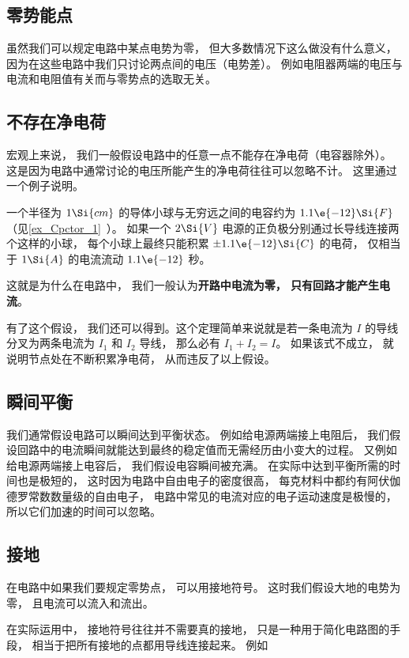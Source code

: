 
\begin{issues}
\issueDraft
\end{issues}


\subsection{零势能点}
虽然我们可以规定电路中某点电势为零， 但大多数情况下这么做没有什么意义， 因为在这些电路中我们只讨论两点间的电压（电势差）。 例如电阻器两端的电压与电流和电阻值有关而与零势点的选取无关。

\subsection{不存在净电荷}
宏观上来说， 我们一般假设电路中的任意一点不能存在净电荷（电容器除外）。 这是因为电路中通常讨论的电压所能产生的净电荷往往可以忽略不计。 这里通过一个例子说明。

\begin{example}{}
一个半径为 $1\Si{cm}$ 的导体小球与无穷远之间的电容约为 $1.1\e{-12} \Si{F}$（见\autoref{ex_Cpctor_1}~）。 如果一个 $2\Si{V}$ 电源的正负极分别通过长导线连接两个这样的小球， 每个小球上最终只能积累 $\pm 1.1\e{-12} \Si{C}$ 的电荷， 仅相当于 $1\Si{A}$ 的电流流动 $1.1\e{-12}$ 秒。
\end{example}
这就是为什么在电路中， 我们一般认为\textbf{开路中电流为零， 只有回路才能产生电流}。

有了这个假设， 我们还可以得到。这个定理简单来说就是若一条电流为 $I$ 的导线分叉为两条电流为 $I_1$ 和 $I_2$ 导线， 那么必有 $I_1 + I_2 = I$。 如果该式不成立， 就说明节点处在不断积累净电荷， 从而违反了以上假设。

\subsection{瞬间平衡}
我们通常假设电路可以瞬间达到平衡状态。 例如给电源两端接上电阻后， 我们假设回路中的电流瞬间就能达到最终的稳定值而无需经历由小变大的过程。 又例如给电源两端接上电容后， 我们假设电容瞬间被充满。 在实际中达到平衡所需的时间也是极短的， 这时因为电路中自由电子的密度很高， 每克材料中都约有阿伏伽德罗常数数量级的自由电子， 电路中常见的电流对应的电子运动速度是极慢的， 所以它们加速的时间可以忽略。

\subsection{接地}
在电路中如果我们要规定零势点， 可以用接地符号。 这时我们假设大地的电势为零， 且电流可以流入和流出。

在实际运用中， 接地符号往往并不需要真的接地， 只是一种用于简化电路图的手段， 相当于把所有接地的点都用导线连接起来。 例如
